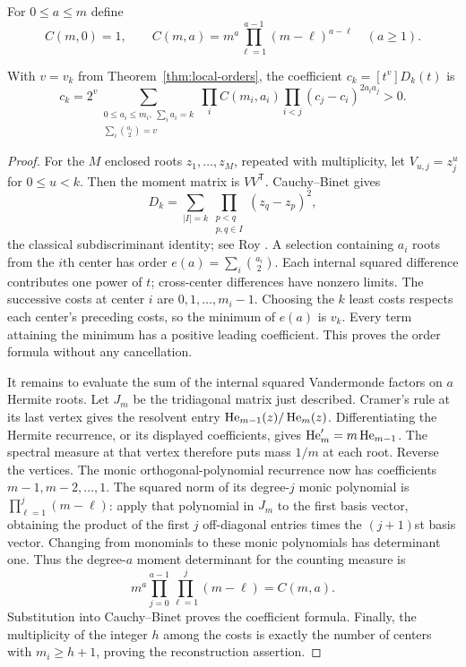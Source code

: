 For $0\le a\le m$ define
\[
 C(m,0)=1,\qquad
 C(m,a)=m^a\prod_{\ell=1}^{a-1}(m-\ell)^{a-\ell}\quad(a\ge1).
\]
\begin{proposition}\label{prop:leading-coefficient}
With $v=v_k$ from Theorem~\ref{thm:local-orders}, the coefficient $c_k=[t^v]D_k(t)$ is
\[
 c_k=2^v\!\sum_{\substack{0\le a_i\le m_i,\ \sum_i a_i=k\\
                  \sum_i\binom{a_i}{2}=v}}
       \prod_i C(m_i,a_i)\prod_{i<j}(c_j-c_i)^{2a_i a_j}>0.
\]
\end{proposition}
\begin{proof}
For the $M$ enclosed roots $z_1,\ldots,z_M$, repeated with multiplicity, let $V_{u,j}=z_j^u$ for $0\le u<k$. Then the moment matrix is $VV^{\mathsf T}$. Cauchy--Binet gives
\[
 D_k=\sum_{|I|=k}\prod_{\substack{p<q\\p,q\in I}}(z_q-z_p)^2,
\]
the classical subdiscriminant identity; see Roy \cite[Proposition~1]{roy}. A selection containing $a_i$ roots from the $i$th center has order $e(a)=\sum_i\binom{a_i}{2}$. Each internal squared difference contributes one power of $t$; cross-center differences have nonzero limits. The successive costs at center $i$ are $0,1,\ldots,m_i-1$. Choosing the $k$ least costs respects each center's preceding costs, so the minimum of $e(a)$ is $v_k$. Every term attaining the minimum has a positive leading coefficient. This proves the order formula without any cancellation.

It remains to evaluate the sum of the internal squared Vandermonde factors on $a$ Hermite roots. Let $J_m$ be the tridiagonal matrix just described. Cramer's rule at its last vertex gives the resolvent entry $\operatorname{He}_{m-1}(z)/\operatorname{He}_m(z)$. Differentiating the Hermite recurrence, or its displayed coefficients, gives $\operatorname{He}_m'=m\operatorname{He}_{m-1}$. The spectral measure at that vertex therefore puts mass $1/m$ at each root. Reverse the vertices. The monic orthogonal-polynomial recurrence now has coefficients $m-1,m-2,\ldots,1$. The squared norm of its degree-$j$ monic polynomial is $\prod_{\ell=1}^j(m-\ell)$: apply that polynomial in $J_m$ to the first basis vector, obtaining the product of the first $j$ off-diagonal entries times the $(j+1)$st basis vector. Changing from monomials to these monic polynomials has determinant one. Thus the degree-$a$ moment determinant for the counting measure is
\[
 m^a\prod_{j=0}^{a-1}\prod_{\ell=1}^j(m-\ell)=C(m,a).
\]
Substitution into Cauchy--Binet proves the coefficient formula. Finally, the multiplicity of the integer $h$ among the costs is exactly the number of centers with $m_i\ge h+1$, proving the reconstruction assertion.
\end{proof}

